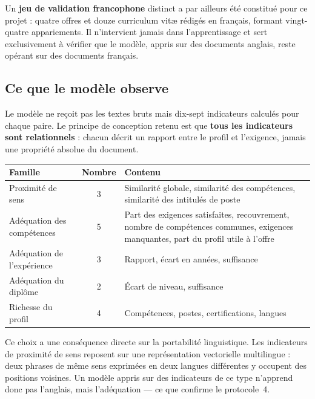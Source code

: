 \documentclass[11pt,a4paper]{article}
\begin{document}
\vspace{2mm}
\noindent Un \textbf{jeu de validation francophone} distinct a par ailleurs été constitué pour ce projet : quatre offres et douze curriculum vitæ rédigés en français, formant vingt-quatre appariements. Il n'intervient jamais dans l'apprentissage et sert exclusivement à vérifier que le modèle, appris sur des documents anglais, reste opérant sur des documents français.

\subsection{Ce que le modèle observe}
Le modèle ne reçoit pas les textes bruts mais dix-sept indicateurs calculés pour chaque paire. Le principe de conception retenu est que \textbf{tous les indicateurs sont relationnels} : chacun décrit un rapport entre le profil et l'exigence, jamais une propriété absolue du document.

\begin{center}
\small
\begin{tabular}{lcp{7.4cm}}
  \toprule
  \textbf{Famille} & \textbf{Nombre} & \textbf{Contenu} \\
  \midrule
  Proximité de sens & 3 & Similarité globale, similarité des compétences, similarité des intitulés de poste \\[1mm]
  Adéquation des compétences & 5 & Part des exigences satisfaites, recouvrement, nombre de compétences communes, exigences manquantes, part du profil utile à l'offre \\[1mm]
  Adéquation de l'expérience & 3 & Rapport, écart en années, suffisance \\[1mm]
  Adéquation du diplôme & 2 & Écart de niveau, suffisance \\[1mm]
  Richesse du profil & 4 & Compétences, postes, certifications, langues \\
  \bottomrule
\end{tabular}
\end{center}

\vspace{2mm}
\noindent Ce choix a une conséquence directe sur la portabilité linguistique. Les indicateurs de proximité de sens reposent sur une représentation vectorielle multilingue : deux phrases de même sens exprimées en deux langues différentes y occupent des positions voisines. Un modèle appris sur des indicateurs de ce type n'apprend donc pas l'anglais, mais l'adéquation — ce que confirme le protocole~4.
\end{document}

